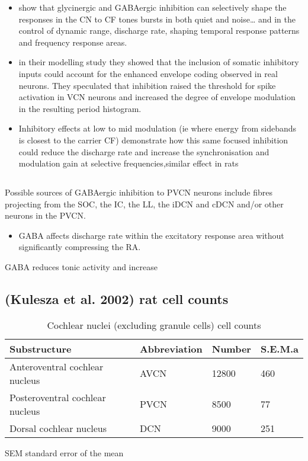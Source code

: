 \documentclass[10pt,a4paper]{article}
\begin{document}
\begin{itemize}
\item
  \citep{CasparyBackoffEtAl:1994,CasparyHelfertEtAl:1997,CasparyPalombiEtAl:1993,EbertOstwald:1995,PalombiCaspary:1992}
  show that glycinergic and GABAergic inhibition can selectively shape the
  responses in the CN to CF tones bursts in both quiet and noise{\dots} and in
  the control of dynamic range, discharge rate, shaping temporal response
  patterns and frequency response areas.
\item \citep{WangSachs:1995,WangSachsEtAl:1992} in their modelling study they
  showed that the inclusion of somatic inhibitory inputs could account for the
  enhanced envelope coding observed in real neurons.  They speculated that
  inhibition raised the threshold for spike activation in VCN neurons and
  increased the degree of envelope modulation in the resulting period histogram.
\item Inhibitory effects at low to mid modulation (ie where energy from
  sidebands is closest to the carrier CF) demonstrate how this same focused
  inhibition could reduce the discharge rate and increase the synchronisation
  and modulation gain at selective frequencies,similar effect in rats
  \citep{Moller:1972}
\end{itemize}

\subsection{\citep{PalombiCaspary:1992}}
Possible sources of GABAergic inhibition to PVCN
neurons include fibres projecting from the SOC, the IC, the LL, the iDCN and
cDCN and/or other neurons in the PVCN.


\begin{itemize}
\item GABA affects discharge rate within the excitatory response area without  significantly compressing the RA.
\end{itemize}

GABA reduces tonic activity and increase

\subsection{(Kulesza et al. 2002) rat cell counts}

\begin{table}[h]
\caption{Cochlear nuclei (excluding granule cells) cell counts}
\begin{tabularx}{\textwidth}{XXXX}
\toprule
         Substructure           & Abbreviation & Number & S.E.M.a \\ \midrule
Anteroventral cochlear nucleus  &     AVCN     & 12800  & 460 \\
Posteroventral cochlear nucleus &     PVCN     &  8500  & 77 \\
    Dorsal cochlear nucleus     &     DCN      &  9000  & 251 \\
\bottomrule
\end{tabularx}
\footnotesize{SEM standard error of the mean}
\end{table}
\end{document}

